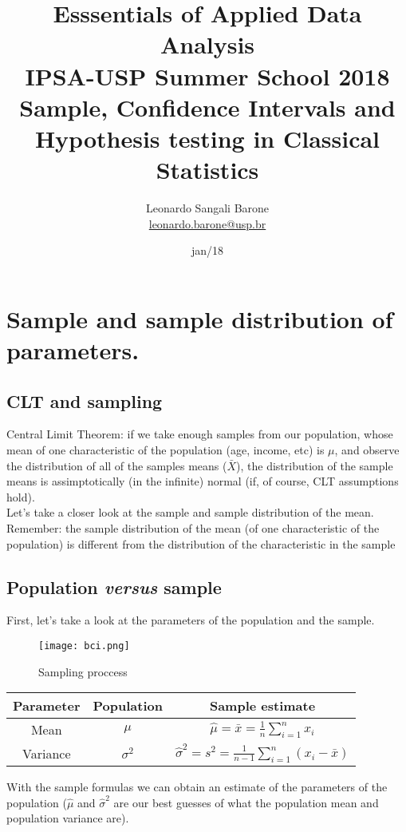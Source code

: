 \documentclass[11pt]{article}
\title{\textbf{Esssentials of Applied Data Analysis\\
				IPSA-USP Summer School 2018}\newline\\
				Sample, Confidence Intervals and Hypothesis testing in Classical Statistics}
\author{Leonardo Sangali Barone\\ \href{leonardo.barone@usp.br}{leonardo.barone@usp.br}}
\date{jan/18}
\begin{document}
\maketitle
\section{Sample and sample distribution of parameters.}

	\subsection*{CLT and sampling}
	
	Central Limit Theorem: if we take enough samples from our population, whose mean of one characteristic of the population (age, income, etc) is $\mu$, and observe the distribution of all of the samples means ($\bar{X}$), the distribution of the sample means is assimptotically (in the infinite) normal (if, of course, CLT assumptions hold).\\

	Let's take a closer look at the sample and sample distribution of the mean.\\
	
	Remember: the sample distribution of the mean (of one characteristic of the population) is different from the distribution of the characteristic in the sample

	\subsection*{Population \emph{versus} sample}
	First, let's take a look at the parameters of the population and the sample.\\

\begin{figure}[htp]
\centering
\texttt{[image: bci.png]}
\caption{Sampling proccess}
\label{}
\end{figure}

\begin{tabular}{|c|c|c|}
\hline
	Parameter & Population & Sample estimate\\ 
\hline
	Mean & $\mu$ & $\hat{\mu} = \bar{x} = \frac{1}{n}\sum\limits_{i=1}^n x_i $\\
	Variance & $\sigma^2$ & $\hat{\sigma}^2 = s^2 = \frac{1}{n-1}\sum\limits_{i=1}^n (x_i - \bar{x}) $\\
\hline
\end{tabular}

With the sample formulas we can obtain an estimate of the parameters of the population ($\hat{\mu}$ and $\hat{\sigma}^2$ are our best guesses of what the population mean and population variance are).
\end{document}
